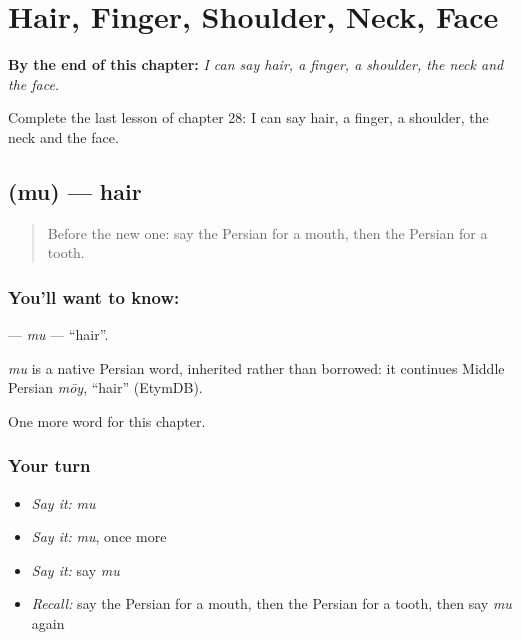 
\chapter{Hair, Finger, Shoulder, Neck, Face}
\label{ch:fa-hair-finger-shoulder-neck-face}

\begin{chapteropening}
\textbf{By the end of this chapter:} \emph{I can say hair, a finger, a shoulder, the neck and the face.}

Complete the last lesson of chapter 28: I can say hair, a finger, a shoulder, the neck and the face.
\end{chapteropening}

\section[\texorpdfstring{\fa{مو} (mu)}{مو (mu)}]{ (mu) — hair}

\label{lesson:FA-C28-mu}



\begin{quote}
Before the new one: say the Persian for a mouth, then the Persian for a tooth.
\end{quote}

\subsection*{You'll want to know: }
\textbf{} — \emph{mu} — \textquotedblleft{}hair\textquotedblright{}.

\begin{cousinweb}
\emph{mu} is a native Persian word, inherited rather than borrowed: it continues Middle Persian \emph{mōy}, \textquotedblleft{}hair\textquotedblright{} (EtymDB).
\end{cousinweb}

\begin{grammarlens}[title={What you've built}]
One more word for this chapter.
\end{grammarlens}

\subsection*{Your turn}
\begin{itemize}
\raggedright
  \item \emph{Say it:} \emph{mu}
  \item \emph{Say it:} \emph{mu}, once more
  \item \emph{Say it:} say \emph{mu}
  \item \emph{Recall:} say the Persian for a mouth, then the Persian for a tooth, then say \emph{mu} again
\end{itemize}

